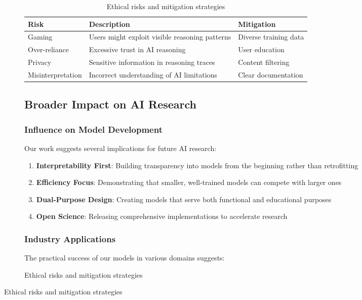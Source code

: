 \begin{figure}[H]
\begin{table}[H]
\begin{figure}[H]
\begin{table}[H]
\begin{table}[H]
\centering
\begin{tabular}{lp{5cm}p{4cm}}
\toprule
Risk & Description & Mitigation \\
\midrule
Gaming & Users might exploit visible reasoning patterns & Diverse training data \\
Over-reliance & Excessive trust in AI reasoning & User education \\
Privacy & Sensitive information in reasoning traces & Content filtering \\
Misinterpretation & Incorrect understanding of AI limitations & Clear documentation \\
\bottomrule
\end{tabular}
\caption{Ethical risks and mitigation strategies}
\label{tab:ethical-risks}
\end{table}

\subsection{Broader Impact on AI Research}

\subsubsection{Influence on Model Development}

Our work suggests several implications for future AI research:

\begin{enumerate}
    \item \textbf{Interpretability First}: Building transparency into models from the beginning rather than retrofitting
    \item \textbf{Efficiency Focus}: Demonstrating that smaller, well-trained models can compete with larger ones
    \item \textbf{Dual-Purpose Design}: Creating models that serve both functional and educational purposes
    \item \textbf{Open Science}: Releasing comprehensive implementations to accelerate research
\end{enumerate}

\subsubsection{Industry Applications}

The practical success of our models in various domains suggests:


\end{table}
\end{figure}
\end{table}
\end{figure}
